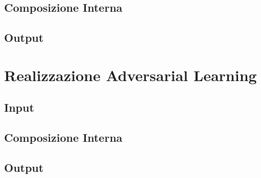\subsection{Composizione Interna}
\label{classificatorenninterno}

\subsection{Output}
\label{classificatorennoutput}

\section{Realizzazione Adversarial Learning}
\label{adv}

\subsection{Input}
\label{advinput}

\subsection{Composizione Interna}
\label{advinterno}

\subsection{Output}
\label{advoutput}

